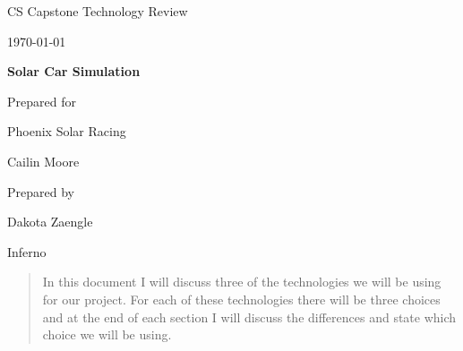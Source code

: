 \documentclass[onecolumn, draftclsnofoot,10pt, compsoc]{IEEEtran}
\def \CapstoneTeamName{		Inferno}
\def \CapstoneProjectName{		Solar Car Simulation}
\def \CapstoneSponsorCompany{	Phoenix Solar Racing}
\def \CapstoneSponsorPerson{		Cailin Moore}
\def \DocType{		%
				Technology Review
				}
\newcommand{\NameSigPair}[1]{\par
\makebox[2.75in][r]{#1} \hfil 	\makebox[3.25in]{\makebox[2.25in]{\hrulefill} \hfill		\makebox[.75in]{\hrulefill}}
\par\vspace{-12pt} \textit{\tiny\noindent
\makebox[2.75in]{} \hfil		\makebox[3.25in]{\makebox[2.25in][r]{Signature} \hfill	\makebox[.75in][r]{Date}}}}
\renewcommand{\NameSigPair}[1]{#1}
\begin{document}
\begin{titlepage}
    \begin{singlespace}
        \hfill
        \begin{flushleft}
        \end{flushleft}
        \par\vspace{.2in}
        \centering
        \scshape{
            \huge CS Capstone \DocType \par
            {\large\today}\par
            \vspace{.5in}
            \textbf{\Huge\CapstoneProjectName}\par
            \vfill
            {\large Prepared for}\par
            \Huge \CapstoneSponsorCompany\par
            \vspace{5pt}
            {\Large\NameSigPair{\CapstoneSponsorPerson}\par}
            {\large Prepared by }\par
            Dakota Zaengle\par
            \CapstoneTeamName\par 
            \vspace{5pt}
            
            \vspace{20pt}
        }
        \begin{abstract}
        	In this document I will discuss three of the technologies we will be using for our project. 
        	For each of these technologies there will be three choices and at the end of each section I will discuss the differences and state which choice we will be using.

        \end{abstract}     
    \end{singlespace}
\end{titlepage}
\newpage
{}
\tableofcontents
\clearpage
\end{document}

